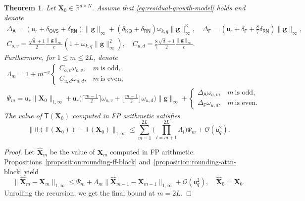 \documentclass[namedate,webpdf,imanum]{ima-authoring-template}
\newcommand{\Real}{\mathbb{R}}
\newcommand{\Matrix}[1]{\mathbf{#1}}
\newcommand{\Norm}[3][]{#1\| #2 #1\|_{\mathrm{#3}}}
\newcommand{\Layer}[1]{\mathsf{#1}}
\newcommand{\fl}[2][]{\mathsf{fl}#1( #2 #1)}
\newcommand{\uh}{\mathsf{u}}
\newcommand{\Oh}[2][]{\mathcal{O}#1( #2 #1)}
\newtheorem{theorem}{Theorem}[section]%
\numberwithin{equation}{section}
\begin{document}
\begin{theorem}
\label{theorem:rounding-deep}
Let $\Matrix{X}_0 \in \Real^{d \times N}$.
Assume that \eqref{eq:residual-growth-model} holds and denote
\begin{gather*}
    \Delta_{\Layer{A}} = (\uh_r + \delta_{\Layer{OVS}} + \delta_{\Layer{RN}}) \Norm{\Matrix{g}}{\infty} + (\delta_{\Layer{KQ}} + \delta_{\Layer{RN}}) \omega_{k,q} \Norm{\Matrix{g}}{\infty}^3, \quad \Delta_{\Layer{F}} = (\uh_r + \delta_{\Layer{F}} + \tfrac{8}{7} \delta_{\Layer{RN}}) \Norm{\Matrix{g}}{\infty}, \\
    C_{o,v} = \frac{\sqrt{d} + 1}{2} \frac{\Norm{\Matrix{g}}{\infty}}{c} (1 + \omega_{k,q} \Norm{\Matrix{g}}{\infty}^2), \quad C_{u,d} = \frac{8}{7} \frac{\sqrt{d} + 1}{2} \frac{\Norm{\Matrix{g}}{\infty}}{c}.
\end{gather*}
Furthermore, for $1 \leq m \leq 2L$, denote 
\begin{gather*}
    \Lambda_m = 1 + m^{-\upsilon} \begin{cases}
        C_{o,v} \omega_{o,v}, & m~\text{is odd}, \\
        C_{u,d} \omega_{u,d}, & m~\text{is even},
    \end{cases} \\
    \Psi_m = \uh_r \Norm{\Matrix{X}_0}{1,\infty} + \uh_r \Big( \Big\lceil \frac{m-1}{2} \Big\rceil \omega_{o,v} + \Big\lfloor \frac{m-1}{2} \Big\rfloor \omega_{u,d} \Big) \Norm{\Matrix{g}}{\infty} + \begin{cases}
        \Delta_{\Layer{A}} \omega_{o,v}, & m~\text{is odd}, \\
        \Delta_{\Layer{F}} \omega_{u,d}, & m~\text{is even}.
    \end{cases}
\end{gather*}
The value of $\Layer{T}(\Matrix{X}_0)$ computed in FP arithmetic satisfies
\begin{equation*}
    \Norm{\fl{\Layer{T}(\Matrix{X}_0)} - \Layer{T}(\Matrix{X}_0)}{1,\infty} \leq \sum_{m = 1}^{2L} \Big( \prod_{l = m + 1}^{2L} \Lambda_l \Big) \Psi_m + \Oh{\uh_q^2}.
\end{equation*}
\end{theorem}
\begin{proof}
Let $\Matrix{\hat{X}}_m$ be the value of $\Matrix{X}_m$ computed in FP arithmetic.
Propositions~\ref{proposition:rounding-ff-block} and~\ref{proposition:rounding-attn-block} yield
\begin{equation*}
    \Norm{\Matrix{\hat{X}}_m - \Matrix{X}_m}{1, \infty} \leq \Psi_m + \Lambda_m \Norm{\Matrix{\hat{X}}_{m-1} - \Matrix{X}_{m-1}}{1,\infty} + \Oh{\uh_q^2}, \quad \Matrix{\hat{X}}_0 = \Matrix{X}_0.
\end{equation*}
Unrolling the recursion, we get the final bound at $m = 2L$.
\end{proof}
\end{document}
